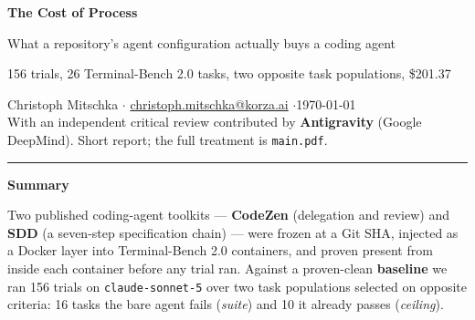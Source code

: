 \documentclass[11pt,a4paper]{article}
\newcommand{\code}[1]{\texttt{\small #1}}
\begin{document}
\thispagestyle{empty}
\noindent{\color{accent}\rule{\linewidth}{1.2pt}}\par\vspace{0.35cm}
{\LARGE\bfseries The Cost of Process\par}
\vspace{0.25cm}
{\large What a repository's agent configuration actually buys a coding agent\par}
\vspace{0.3cm}
{\normalsize 156 trials, 26 Terminal-Bench 2.0 tasks, two opposite task populations, \$201.37\par}
\vspace{0.3cm}
\noindent{\color{accent}\rule{\linewidth}{1.2pt}}\par\vspace{0.45cm}

\noindent
{\small Christoph Mitschka \quad$\cdot$\quad
\href{mailto:christoph.mitschka@korza.ai}{christoph.mitschka@korza.ai} \quad$\cdot$\quad \today\\[0.15cm]
With an independent critical review contributed by \textbf{Antigravity} (Google DeepMind).
Short report; the full treatment is \code{main.pdf}.}

\vspace{0.45cm}
\hrule
\vspace{0.35cm}

\noindent\textbf{\large Summary}
\smallskip

\noindent Two published coding-agent toolkits --- \textbf{CodeZen} (delegation and review)
and \textbf{SDD} (a seven-step specification chain) --- were frozen at a Git SHA, injected as
a Docker layer into Terminal-Bench 2.0 containers, and proven present from inside each
container before any trial ran. Against a proven-clean \textbf{baseline} we ran 156 trials on
\code{claude-sonnet-5} over two task populations selected on opposite criteria: 16 tasks the
bare agent fails (\emph{suite}) and 10 it already passes (\emph{ceiling}).
\end{document}
